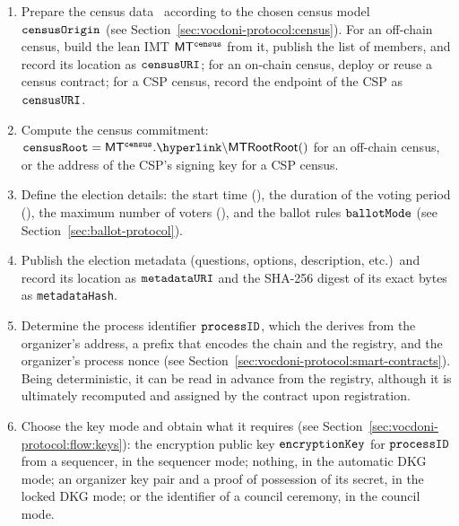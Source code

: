 \begin{enumerate}

	\item Prepare the census data \censusdata\ according to the chosen census model $\texttt{censusOrigin}$ (see Section~\ref{sec:vocdoni-protocol:census}). For an off-chain census, build the lean \ac{IMT} $\sf{MT^{\texttt{census}}}$ from it, publish the list of members, and record its location as $\texttt{censusURI}$; for an on-chain census, deploy or reuse a census contract; for a \ac{CSP} census, record the endpoint of the \ac{CSP} as $\texttt{censusURI}$.

	\item Compute the census commitment: $\censusroot = \censusTree.\hlget{\MTRoot}()$ for an off-chain census, or the address of the \ac{CSP}'s signing key for a \ac{CSP} census.

	\item Define the election details: the start time (\starttime), the duration of the voting period (\duration), the maximum number of voters (\maxvoters), and the ballot rules $\texttt{ballotMode}$
	(see Section~\ref{sec:ballot-protocol}).

	\item Publish the election metadata (questions, options, description, etc.)\ and record its location as $\texttt{metadataURI}$ and the SHA-256 digest of its exact bytes as \texttt{metadataHash}.

	\item Determine the process identifier $\texttt{processID}$, which the \hlget{\processregistry} derives from the organizer's address, a prefix that encodes the chain and the registry, and the organizer's process nonce (see Section~\ref{sec:vocdoni-protocol:smart-contracts}). Being deterministic, it can be read in advance from the registry, although it is ultimately recomputed and assigned by the contract upon registration.

	\item Choose the key mode \keymode and obtain what it requires (see Section~\ref{sec:vocdoni-protocol:flow:keys}): the encryption public key $\texttt{encryptionKey}$ for $\texttt{processID}$ from a sequencer, in the sequencer mode; nothing, in the automatic \ac{DKG} mode; an organizer key pair and a proof of possession of its secret, in the locked \ac{DKG} mode; or the identifier of a council ceremony, in the council mode.


\end{enumerate}
